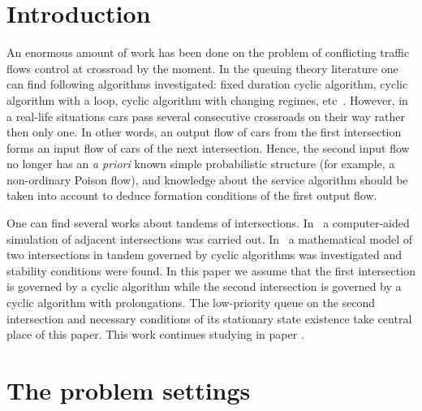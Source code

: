 \documentclass[runningheads,a4paper]{llncs}
\begin{document}
\section{Introduction}
An enormous amount of work has been done on the problem of conflicting traffic flows control at crossroad by the moment. In the queuing theory literature one can find following algorithms investigated: fixed duration cyclic algorithm, cyclic algorithm with a loop, cyclic algorithm with changing regimes, etc~\cite{n:f:p:1968,f:1977,f:1977-1,l:f:2000,p:f:2008,a:b:2010}. However, in a real-life situations cars pass several consecutive crossroads on their way rather then only one. In other words, an output flow of cars from
the first intersection forms an input flow of cars of the next intersection. Hence, the second input flow
no longer has an \textit{a priori} known simple probabilistic structure (for example, a
non-ordinary Poison flow), and knowledge about the service algorithm should be taken into account to deduce formation conditions of the first output flow.

One can find several works about tandems of intersections. In~\cite{y:l:1985} a computer-aided
simulation of adjacent intersections was carried out. In~\cite{z:2012} a mathematical model of two intersections in tandem governed by cyclic algorithms was investigated and stability conditions were found. In this paper we assume that the first intersection is governed by a cyclic algorithm while the second intersection is governed by a cyclic algorithm with prolongations. The low-priority queue on the second intersection and necessary conditions of its stationary state existence take central place of this paper. This work continues studying in paper \cite{k:z:2016}.

\section{The problem settings}
\end{document}
